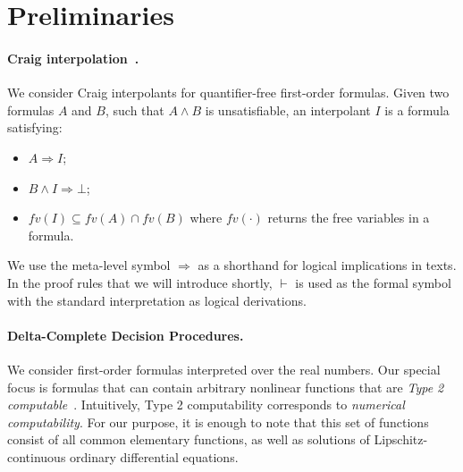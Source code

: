 \section{Preliminaries}
\label{sec:prelim}

\paragraph{Craig interpolation~\cite{MR0104564}.}
We consider Craig interpolants for quantifier-free first-order formulas. Given two formulas $A$ and $B$, such that $A ∧ B$ is unsatisfiable, an interpolant $I$ is a formula satisfying:
\begin{itemize}
\item $A ⇒ I$;
\item $B ∧ I ⇒ ⊥$;
\item $fv(I) ⊆ fv(A) ∩ fv(B)$ where $fv(\cdot)$ returns the free variables in a formula.
\end{itemize}
\begin{notation}
We use the meta-level symbol $\Rightarrow$ as a shorthand for logical implications in texts. In the proof rules that we will introduce shortly, $\vdash$ is used as the formal symbol with the standard interpretation as logical derivations. 
\end{notation}

\paragraph{Delta-Complete Decision Procedures.}

We consider first-order formulas interpreted over the real numbers. Our special focus is formulas that can contain arbitrary nonlinear functions that are {\em Type 2 computable}~\cite{CAbook,vasco}. Intuitively, Type 2 computability corresponds to {\em numerical computability}. For our purpose, it is enough to note that this set of functions consist of all common elementary functions, as well as solutions of Lipschitz-continuous ordinary differential equations. 

